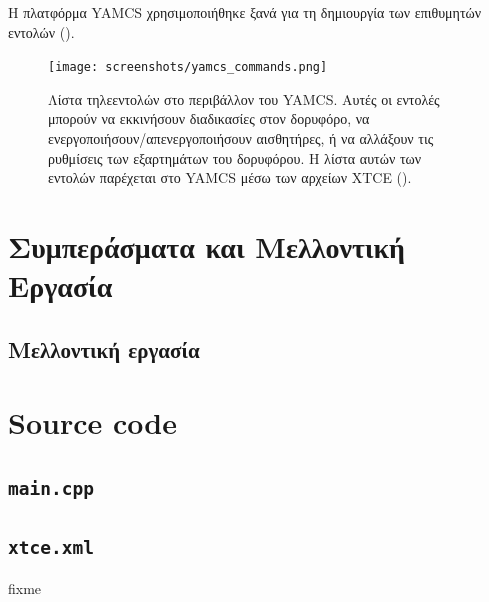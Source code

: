 \documentclass[a4paper,nobib]{tufte-book}
\begin{document}
Η πλατφόρμα \ac{YAMCS} χρησιμοποιήθηκε ξανά για τη δημιουργία των επιθυμητών εντολών ().

\begin{figure}[h]
	\texttt{[image: screenshots/yamcs\_commands.png]}
	\caption[Λίστα τηλεεντολών στο περιβάλλον του \acs{YAMCS}]{Λίστα τηλεεντολών στο περιβάλλον του \acs{YAMCS}. Αυτές οι εντολές μπορούν να εκκινήσουν διαδικασίες στον δορυφόρο, να ενεργοποιήσουν/απενεργοποιήσουν αισθητήρες, ή να αλλάξουν τις ρυθμίσεις των εξαρτημάτων του δορυφόρου. Η λίστα αυτών των εντολών παρέχεται στο \acs{YAMCS} μέσω των αρχείων \ac{XTCE} ().}
	\label{fig:yamcs_commands}
\end{figure}



\chapter{Συμπεράσματα και Μελλοντική Εργασία}
\label{cap:conclusion}


\section{Μελλοντική εργασία}

\appendix

\begin{fullwidth}
\printbibliography[heading=bibnumbered]
\end{fullwidth}


\printindex

\chapter{Source code}
\label{sec:source_code}



\section*{\texttt{main.cpp}}


\newpage
\section*{\texttt{xtce.xml}}
\label{app:xtce}

fixme


\end{document}
